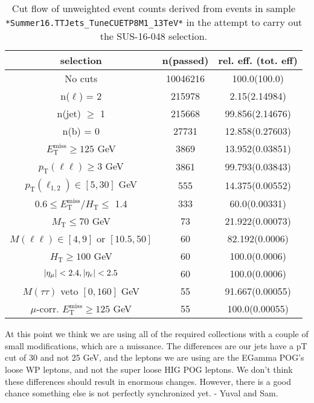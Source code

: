 \documentclass[12pt,A4paper]{article}
\DeclarePairedDelimiter\abs{\lvert}{\rvert}
\begin{document}
\begin{table}
\begin{centering}
\begin{tabular}{ | c | c | c | }
\hline
selection & n(passed) & rel. eff. (tot. eff) \\
\hline
No cuts & 10046216 & 100.0(100.0) \\
n($\ell$) = 2 & 215978 & 2.15(2.14984) \\
n(jet) $\geq$ 1 & 215668 & 99.856(2.14676) \\
n(b) = 0 & 27731 & 12.858(0.27603) \\
$E_{\text{T}}^{\text{miss}} \geq 125$ GeV & 3869 & 13.952(0.03851) \\
$p_{\text{T}}(\ell\ell) \geq 3$ GeV & 3861 & 99.793(0.03843) \\
$p_{\text{T}}(\ell_{1,2}) \in [5,30]$ GeV & 555 & 14.375(0.00552) \\
$0.6 \leq E_{\text{T}}^{\text{miss}}/H_{\text{T}} \leq$ 1.4 & 333 & 60.0(0.00331) \\
$M_{\text{T}} \leq 70$ GeV & 73 & 21.922(0.00073) \\
$M(\ell\ell) \in [4,9]$ or $[10.5,50]$ & 60 & 82.192(0.0006) \\
$H_{\text{T}} \geq 100$ GeV & 60 & 100.0(0.0006) \\
$\abs{\eta_{\mu}}<2.4,\abs{\eta_{e}}<2.5$ & 60 & 100.0(0.0006) \\
$M(\tau\tau)$ veto $[0,160]$ GeV & 55 & 91.667(0.00055) \\
$\mu$-corr. $E_{\text{T}}^{\text{miss}} \geq 125$ GeV & 55 & 100.0(0.00055) \\

\hline
\end{tabular}
\caption{Cut flow of unweighted event counts derived from events in sample \texttt{*Summer16.TTJets\_TuneCUETP8M1\_13TeV*} in the attempt to carry out the SUS-16-048 selection.}
\end{centering}
\end{table}

At this point we think we are using all of the required collections with a couple of small modifications, which are a nuissance. The differences are our jets have a pT cut of 30 and not 25 GeV, and the leptons we are using are the EGamma POG's loose WP leptons, and not the super loose HIG POG leptons. We don't think these differences should result in enormous changes. However, there is a good chance something else is not perfectly synchronized yet. - Yuval and Sam.
\end{document}
